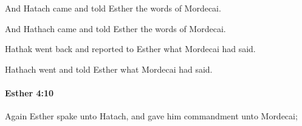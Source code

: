 			And Hatach came and told Esther the words of Mordecai.

			\begin{versebox}
					\item[BHS] 
					\item[LXX] 
					\item[ASV] And Hathach came and told Esther the words of Mordecai.
					\item[NIV] Hathak went back and reported to Esther what Mordecai had said.
					\item[NRSV] Hathach went and told Esther what Mordecai had said.
			\end{versebox}

		\paragraph{Esther 4:10} %
			\label{ESTHER-4-10}

			Again Esther spake unto Hatach, and gave him commandment unto Mordecai;

